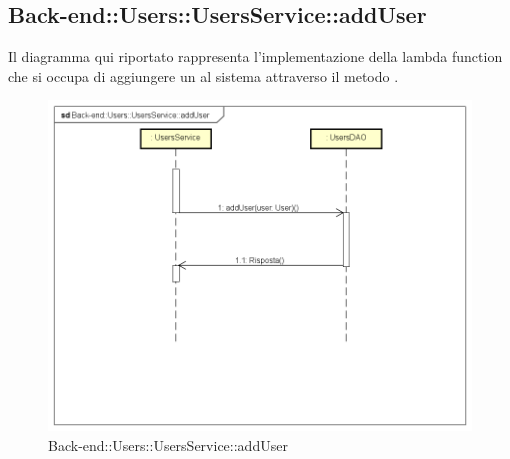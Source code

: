 \subsection{Back-end::Users::UsersService::addUser}
Il diagramma qui riportato rappresenta l'implementazione della lambda function che si occupa di aggiungere un  al sistema attraverso il metodo . 
 \begin{figure}[h] \centering \includegraphics[width=\textwidth,height=\textheight,keepaspectratio]{images/diagrams/back-end/Ufficial_Backend/Back-endUsersUsersServiceaddUser.png} 	\caption{Back-end::Users::UsersService::addUser}
\end{figure}

\newpage
